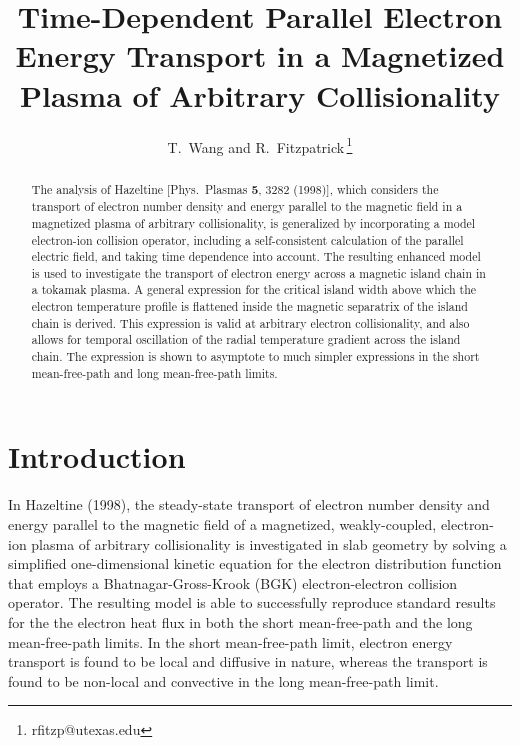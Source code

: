 \documentclass[12pt,prb,aps]{revtex4-1}
\begin{document}
\title{Time-Dependent Parallel Electron Energy Transport in  a Magnetized Plasma of Arbitrary Collisionality}
\author{T.~Wang and R.~Fitzpatrick\,\footnote{rfitzp@utexas.edu}}

\begin{abstract}
The analysis of Hazeltine [Phys.\ Plasmas {\bf 5}, 3282 (1998)], which considers the transport of electron number density and energy parallel to the magnetic
field in a magnetized plasma of arbitrary collisionality,  is generalized by  incorporating a model electron-ion collision operator,
 including a self-consistent calculation of the parallel electric field, and taking time dependence into account. The resulting enhanced model is
 used to investigate the transport of electron energy across a magnetic island chain in a tokamak plasma. A general expression for the critical
 island width above which the electron temperature profile is flattened inside the magnetic separatrix of the island chain is derived.
 This expression is valid at arbitrary electron collisionality, and also allows for temporal oscillation of the radial temperature gradient across the island chain. 
 The expression is shown to asymptote to much  simpler expressions in the short mean-free-path and long mean-free-path limits. 
 \end{abstract}
\maketitle

\section{Introduction}
In Hazeltine (1998),\cite{haz}  the steady-state transport of electron number density and energy parallel to the magnetic field
of a magnetized, weakly-coupled, electron-ion plasma of arbitrary collisionality is investigated  in slab geometry   by solving a simplified one-dimensional kinetic equation for the electron distribution function that employs a Bhatnagar-Gross-Krook (BGK)  electron-electron collision
operator.\cite{krook}  The resulting model is able to successfully reproduce standard results for the the electron heat flux in both the short mean-free-path and
the long mean-free-path limits. In the short mean-free-path limit, electron energy transport is found to be local and diffusive in nature, whereas the transport is found to be non-local and convective in the
long mean-free-path limit. 
\end{document}
